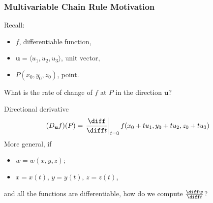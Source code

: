 \begin{frame}
  \frametitle{Multivariable Chain Rule Motivation}

Recall:
\begin{itemize}
  \item $f$, differentiable function,
  \item $\textbf{u}=\langle u_1,u_2,u_3 \rangle$, unit vector,
  \item $P(x_0,y_0,z_0)$, point.
\end{itemize}
%
What is the rate of change of $f$ at $P$ in the direction $\textbf{u}$?

\pause
Directional derivative
%
$$(D_{\textbf{u}}f)(P) = \left. \frac{\diff }{\diff t}\right|_{t=0} f(x_0+tu_1, y_0+tu_2,z_0+tu_3)$$
%
\pause
More general, if
\begin{itemize}
\item $w=w(x,y,z)$;
\item $x=x(t)$, $y=y(t)$, $z=z(t)$,
\end{itemize}
%
and all the functions are differentiable, how do we compute $\frac{\diff w}{\diff t}$?
\end{frame}